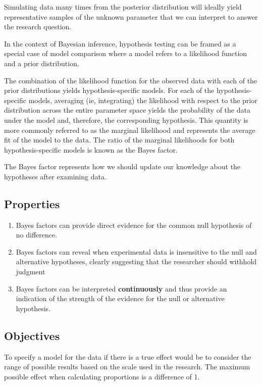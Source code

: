 \documentclass[11pt]{article}
\begin{document}
Simulating data many times from the posterior distribution will ideally yield representative samples of the unknown parameter that we can interpret to answer the research question. \cite{10.1093/ntr/ntz207}
 
In the context of Bayesian inference, hypothesis testing can be framed as a special case of model comparison where a model refers to a likelihood function and a prior distribution. 
 
The combination of the likelihood function for the observed data with each of the prior distributions yields hypothesis-specific models. For each of the hypothesis-specific models, averaging (ie, integrating) the likelihood with respect to the prior distribution across the entire parameter space yields the probability of the data under the model and, therefore, the corresponding hypothesis. This quantity is more commonly referred to as the marginal likelihood and represents the average fit of the model to the data. The ratio of the marginal likelihoods for both hypothesis-specific models is known as the Bayes factor. 

The Bayes factor represents how we should update our knowledge about the hypotheses after examining data. 

\subsection{Properties}

\begin{enumerate}
    \item Bayes factors can provide direct evidence for the common null hypothesis of no difference.
    \item Bayes factors can reveal when experimental data is insensitive to the null and alternative hypotheses, clearly suggesting that the researcher should withhold judgment
    \item Bayes factors can be interpreted \textbf{continuously} and thus provide an indication of the strength of the evidence for the null or alternative hypothesis. 
\end{enumerate}

\subsection{Objectives}

To specify a model for the data if there is a true effect would be to consider the range of possible results based on the scale used in the research. The maximum possible effect when calculating proportions is a difference of 1. \cite{10.1093/geronb/gby065}
\end{document}
